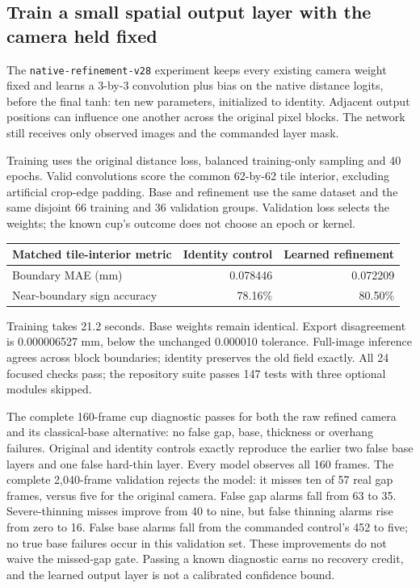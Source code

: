 \documentclass[10pt,letterpaper]{article}
\begin{document}
\subsection*{Train a small spatial output layer with the camera held fixed}
The \texttt{native-refinement-v28} experiment keeps every existing camera weight
fixed and learns a 3-by-3 convolution plus bias on the native distance logits,
before the final tanh: ten new parameters, initialized to identity. Adjacent
output positions can influence one another across the original pixel blocks.
The network still receives only observed images and the commanded layer mask.

Training uses the original distance loss, balanced training-only sampling and
40 epochs. Valid convolutions score the common 62-by-62 tile interior, excluding
artificial crop-edge padding. Base and refinement use the same dataset and the
same disjoint 66 training and 36 validation groups. Validation loss selects the
weights; the known cup's outcome does not choose an epoch or kernel.

\begin{center}
\begin{tabular}{@{}lrr@{}}
\toprule
Matched tile-interior metric & Identity control & Learned refinement \\
\midrule
Boundary MAE (mm) & 0.078446 & 0.072209 \\
Near-boundary sign accuracy & 78.16\% & 80.50\% \\
\bottomrule
\end{tabular}
\end{center}

Training takes 21.2 seconds. Base weights remain identical. Export disagreement
is 0.000006527 mm, below the unchanged 0.000010 tolerance. Full-image inference
agrees across block boundaries; identity preserves the old field exactly.
All 24 focused checks pass; the repository suite passes 147 tests with three
optional modules skipped.

The complete 160-frame cup diagnostic passes for both the raw refined camera and
its classical-base alternative: no false gap, base, thickness or overhang
failures. Original and identity controls exactly reproduce the earlier two false
base layers and one false hard-thin layer. Every model observes all 160 frames.
The complete 2,040-frame validation rejects the model: it misses ten of 57 real
gap frames, versus five for the original camera. False gap alarms fall from 63
to 35. Severe-thinning misses improve from 40 to nine, but false thinning alarms
rise from zero to 16. False base alarms fall from the commanded control's 452
to five; no true base failures occur in this validation set. These improvements
do not waive the missed-gap gate. Passing a known diagnostic earns no recovery
credit, and the learned output layer is not a calibrated confidence bound.
\end{document}
